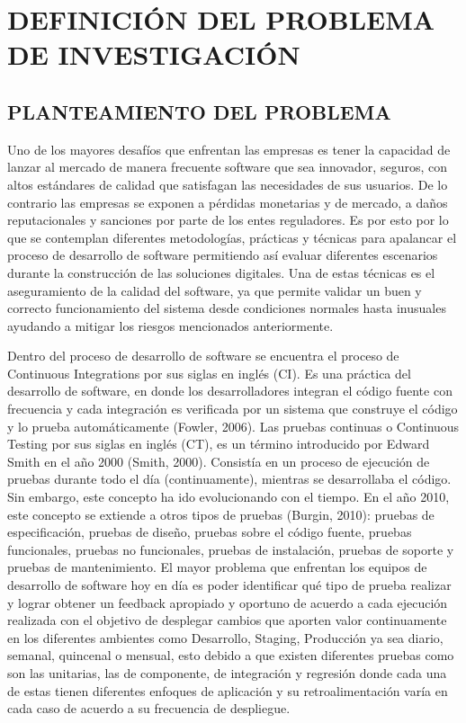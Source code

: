\section{DEFINICIÓN DEL PROBLEMA DE INVESTIGACIÓN}

\subsection{PLANTEAMIENTO DEL PROBLEMA}
Uno de los mayores desafíos que enfrentan las empresas es tener la capacidad de lanzar al mercado de manera frecuente software que sea innovador, seguros, con altos estándares de calidad que satisfagan las necesidades de sus usuarios. De lo contrario las empresas se exponen a pérdidas monetarias y de mercado, a daños reputacionales y sanciones por parte de los entes reguladores. Es por esto por lo que se contemplan diferentes metodologías, prácticas y técnicas para apalancar el proceso de desarrollo de software permitiendo así evaluar diferentes escenarios durante la construcción de las soluciones digitales. Una de estas técnicas es el aseguramiento de la calidad del software, ya que permite validar un buen y correcto funcionamiento del sistema desde condiciones normales hasta inusuales ayudando a mitigar los riesgos mencionados anteriormente.

Dentro del proceso de desarrollo de software se encuentra el proceso de Continuous Integrations por sus siglas en inglés (CI). Es una práctica del desarrollo de software, en donde los desarrolladores integran el código fuente con frecuencia y cada integración  es  verificada por un sistema que construye el código y lo prueba automáticamente \citep {martin} (Fowler, 2006). Las pruebas continuas o Continuous Testing  por sus siglas en inglés (CT), es un término introducido por Edward Smith en el año 2000 (Smith, 2000). Consistía  en  un  proceso de ejecución de pruebas durante todo el día (continuamente), mientras se desarrollaba el código. Sin embargo, este concepto ha ido evolucionando con el tiempo. En  el año 2010, este concepto se extiende a otros tipos de pruebas (Burgin, 2010): pruebas de especificación, pruebas de diseño, pruebas sobre el código  fuente,  pruebas funcionales,  pruebas no funcionales, pruebas de instalación, pruebas de soporte y pruebas de mantenimiento. El mayor problema que enfrentan los equipos de desarrollo de software  hoy en día es poder identificar qué tipo de prueba realizar y lograr obtener un feedback apropiado y oportuno de acuerdo a cada ejecución realizada con el objetivo de desplegar cambios que aporten valor continuamente en los diferentes ambientes como Desarrollo, Staging, Producción ya sea diario, semanal, quincenal o mensual, esto debido a que existen diferentes pruebas como son las unitarias, las de componente, de integración y regresión donde cada una de estas tienen diferentes enfoques de aplicación y su retroalimentación varía en cada caso de acuerdo a su frecuencia de despliegue.

